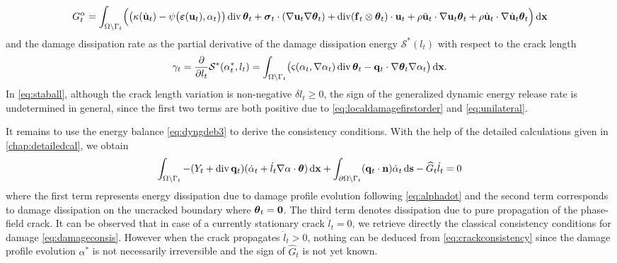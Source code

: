 \begin{equation} \label{eq:GtC}
G_t^\alpha=\int_\domaint\Bigl(\bigl(\kappa(\dot{\vec{u}}_t)-\psi\bigl(\eps(\vec{u}_t),\alpha_t\bigr)\bigr)\div\vtheta_t+\sig_t\cdot(\nabla\vec{u}_t\nabla\vtheta_t)+\div(\vec{f}_t\otimes\vtheta_t)\cdot\vec{u}_t+\rho\ddot{\vec{u}}_t\cdot\nabla\vec{u}_t\vtheta_t+\rho\dot{\vec{u}}_t\cdot\nabla\dot{\vec{u}}_t\vtheta_t\Bigr)\dx
\end{equation}
and the damage dissipation rate as the partial derivative of the damage dissipation energy $\mathcal{S}^*(l_t)$ with respect to the crack length
\begin{equation} \label{eq:Gammat}
\gamma_t=\frac{\partial}{\partial l_t}\mathcal{S}^*(\alpha^*_t,l_t)=\int_\domaint\bigl(\varsigma(\alpha_t,\nabla\alpha_t)\div\vtheta_t-\vec{q}_t\cdot\nabla\vtheta_t\nabla\alpha_t\bigr)\dx.
\end{equation}
In \eqref{eq:staball}, although the crack length variation is non-negative $\delta l_t\geq 0$, the sign of the generalized dynamic energy release rate is undetermined in general, since the first two terms are both positive due to \eqref{eq:localdamagefirstorder} and \eqref{eq:unilateral}.

It remains to use the energy balance \eqref{eq:dyngdeb3} to derive the consistency conditions. With the help of the detailed calculations given in \cref{chap:detailedcal}, we obtain
\begin{equation} \label{eq:crackconsistency}
\int_\domaint-(Y_t+\div\vec{q}_t)(\dot{\alpha}_t+\dot{l}_t\nabla\alpha\cdot\vtheta)\dx+\int_{\partial\Omega\setminus\Gamma_t}(\vec{q}_t\cdot\vec{n})\dot{\alpha}_t\ds-\widehat{G}_t\dot{l}_t=0
\end{equation}
where the first term represents energy dissipation due to damage profile evolution following \eqref{eq:alphadot} and the second term corresponds to damage dissipation on the uncracked boundary where $\vtheta_t=\vec{0}$. The third term denotes dissipation due to pure propagation of the phase-field crack.  It can be observed that in case of a currently stationary crack $\dot{l}_t=0$, we retrieve directly the classical consistency conditions for damage \eqref{eq:damageconsis}. However when the crack propagates $\dot{l}_t>0$, nothing can be deduced from \eqref{eq:crackconsistency} since the damage profile evolution $\alpha^*$ is not necessarily irreversible and the sign of $\widehat{G}_t$ is not yet known.


